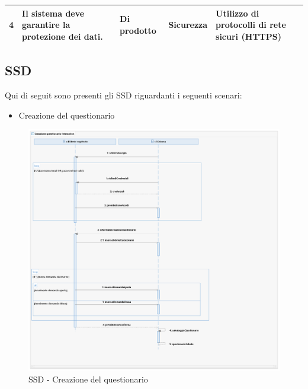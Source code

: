 \documentclass[12pt]{article}
\begin{document}
\begin{table}[H]
\begin{adjustbox}{max width=1.1\textwidth,center}
\begin{tabular}{lllll}
\multicolumn{1}{|l|}{4}                                                          & \multicolumn{1}{l|}{Il sistema deve garantire la protezione dei dati.}                   & \multicolumn{1}{l|}{Di prodotto}                                                  & \multicolumn{1}{l|}{Sicurezza}                                                      & \multicolumn{1}{l|}{Utilizzo di protocolli di rete sicuri (HTTPS)}                     \\ \hline
\end{tabular}
\endgroup
\end{adjustbox}
\end{table}

\subsection{SSD}
Qui di seguit sono presenti gli SSD riguardanti i seguenti scenari:
\begin{itemize}
\item Creazione del questionario
\end{itemize}

\begin{figure}[H]
\includegraphics[scale=0.5, left]{UNIMIBModule_CreazionequestionarioSequenceDiagram.png}
\caption{SSD - Creazione del questionario}
\end{figure}
\end{document}

